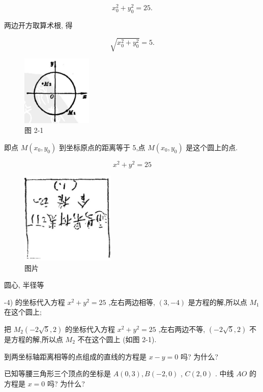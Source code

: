 \documentclass[lang=cn,newtx,10pt,scheme=chinese]{elegantbook}
\begin{document}
\[
    {x}_{0}^{2} + {y}_{0}^{2} = {25}\text{.}
\]

两边开方取算术根, 得

\[
  \sqrt{{x}_{0}^{2} + {y}_{0}^{2}} = 5\text{.}
\]

\begin{figure}[h]
  \centering
  \includegraphics[max width=0.3\textwidth]{images/01912cc2-ffb6-728e-9ae7-b113ff05c64b_66_677276.jpg}
  \caption{图 2-1}
\end{figure}



即点 \(M\left( {{x}_{0},{y}_{0}}\right)\) 到坐标原点的距离等于 5,点 \(M\left( {{x}_{0},{y}_{0}}\right)\) 是这个圆上的点.

\[
    {x}^{2} + {y}^{2} = {25}
\]

\begin{figure}[h]
  \centering
  \includegraphics[max width=0.4\textwidth]{images/01912cc2-ffb6-728e-9ae7-b113ff05c64b_66_273685.jpg}
  \caption{图片}
\end{figure}

圆心, 半径等

-4) 的坐标代入方程 \({x}^{2} + {y}^{2} = {25}\) ,左右两边相等, \(\left( {3, - 4}\right)\) 是方程的解,所以点 \({M}_{1}\) 在这个圆上;

把 \({M}_{2}\left( {-2\sqrt{5},2}\right)\) 的坐标代入方程 \({x}^{2} + {y}^{2} = {25}\) ,左右两边不等, \(\left( {-2\sqrt{5},2}\right)\) 不是方程的解,所以点 \({M}_{2}\) 不在这个圆上 (如图 2-1).

\begin{problemset}[练习]

\item 到两坐标轴距离相等的点组成的直线的方程是 \(x - y = 0\) 吗? 为什么?

\item 已知等腰三角形三个顶点的坐标是 \(A\left( {0,3}\right) ,B\left( {-2,0}\right)\) , \(C\left( {2,0}\right)\) . 中线 \({AO}\) 的方程是 \(x = 0\) 吗? 为什么?

\end{problemset}
\end{document}
